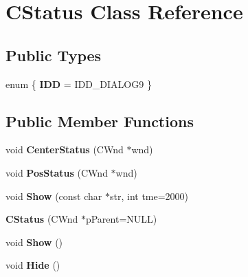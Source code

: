 \hypertarget{class_c_status}{\section{C\-Status Class Reference}
\label{class_c_status}
}
\subsection*{Public Types}
\begin{DoxyCompactItemize}
\item 
enum \{ {\bfseries I\-D\-D} =  I\-D\-D\-\_\-\-D\-I\-A\-L\-O\-G9
 \}
\end{DoxyCompactItemize}
\subsection*{Public Member Functions}
\begin{DoxyCompactItemize}
\item 
\hypertarget{class_c_status_a8b909205b51571f2d12dde56e60476cc}{void {\bfseries Center\-Status} (C\-Wnd $\ast$wnd)}\label{class_c_status_a8b909205b51571f2d12dde56e60476cc}

\item 
\hypertarget{class_c_status_a05cb9a5168e36cd81b0638c8f0398bc5}{void {\bfseries Pos\-Status} (C\-Wnd $\ast$wnd)}\label{class_c_status_a05cb9a5168e36cd81b0638c8f0398bc5}

\item 
\hypertarget{class_c_status_a301a69e604ee8c8b2f19344c859b9691}{void {\bfseries Show} (const char $\ast$str, int tme=2000)}\label{class_c_status_a301a69e604ee8c8b2f19344c859b9691}

\item 
\hypertarget{class_c_status_a5b336c8965565e4355e51f385fca3e98}{{\bfseries C\-Status} (C\-Wnd $\ast$p\-Parent=N\-U\-L\-L)}\label{class_c_status_a5b336c8965565e4355e51f385fca3e98}

\item 
\hypertarget{class_c_status_a2ad314e140b56f647dc531ea986ebc03}{void {\bfseries Show} ()}\label{class_c_status_a2ad314e140b56f647dc531ea986ebc03}

\item 
\hypertarget{class_c_status_a98ff8aa6000cdb2a12f0f8f6c9006e86}{void {\bfseries Hide} ()}\label{class_c_status_a98ff8aa6000cdb2a12f0f8f6c9006e86}

\end{DoxyCompactItemize}
